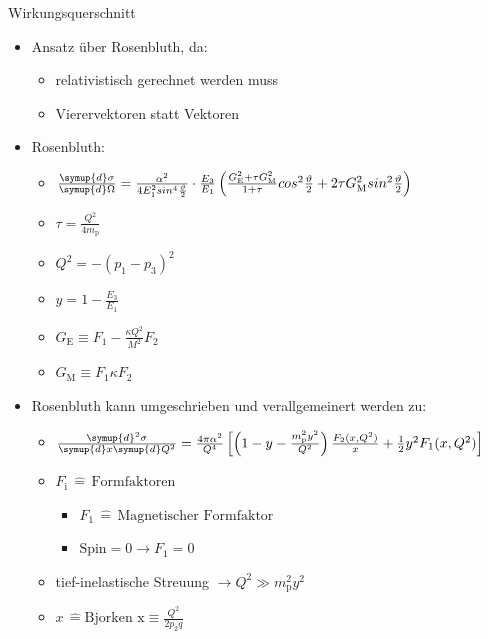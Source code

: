 \documentclass[aspectratio=1610, 9pt]{beamer}
\begin{document}
\begin{frame}{Wirkungsquerschnitt}
\begin{itemize}
  \item{Ansatz über Rosenbluth, da:}
  \begin{itemize}
    \item{relativistisch gerechnet werden muss}
    \item{Vierervektoren statt Vektoren}
  \end{itemize}
  \item{Rosenbluth:}
  \begin{itemize}
    \item{ $ \frac{\symup{d} \sigma}{\symup{d} \Omega }  = \frac{\alpha^2}{4 E^2_1 sin^4{\frac{\vartheta}{2}}} \cdot \frac{E_3}{E_1} \left( \frac{G^2_\text{E}+ \tau G^2_\text{M}}{1+\tau} cos^2{\frac{\vartheta}{2}} +2\tau G^2_\text{M} sin^2{\frac{\vartheta}{2}} \right) $}
    \item{ $ \tau = \frac{Q^2}{4m_\text{p}} $ }
    \item{ $ Q^2 = -(p_1-p_3)^2$ }
    \item{ $y = 1-\frac{E_3}{E_1} $ }
    \item{$G_\text{E} \equiv F_1 - \frac{\kappa Q^2}{M^2} F_2 $}
    \item{$G_\text{M} \equiv F_1 \kappa F_2 $}
  \end{itemize}
\end{itemize}
\end{frame}

\begin{frame}
  \begin{itemize}
  \item{Rosenbluth kann umgeschrieben und verallgemeinert werden zu: }
  \begin{itemize}
    \item{$ \frac{\symup{d}^2\sigma}{ \symup{d}x \symup{d}Q^2} = \frac{4 \pi \alpha^2}{Q^4} \left[ \left( 1 - y - \frac{m^2_\text{p} y^2}{Q^2} \right) \frac{F_2(x, Q^2)}{x} + \frac{1}{2}y^2F_1(x, Q^2) \right]  $}
    \item{$F_\text{i} \,\hat{=} \, \text{Formfaktoren} $}
    \begin{itemize}
      \item{$F_1 \,\hat{=} \, \text{Magnetischer Formfaktor} $}
      \item{$\text{Spin} = 0 \rightarrow F_1 = 0$}
    \end{itemize}
    \item{tief-inelastische Streuung $\rightarrow Q^2 \gg  m^2_\text{p} y^2 $}
    \item{$x \,\hat{=} \text{Bjorken x} \equiv \frac{Q^2}{2 p_2 q} $}
  \end{itemize}
  \end{itemize}
\end{frame}
\end{document}
